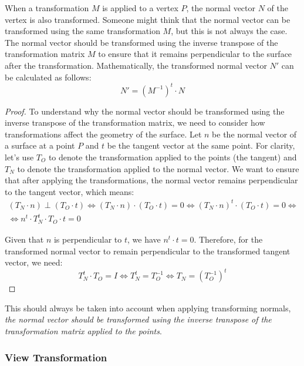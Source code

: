 When a transformation $M$ is applied to a vertex $P$, the normal vector $N$ of the vertex is also transformed. Someone might think that the normal vector can be transformed using the same transformation $M$, but this is not always the case. The normal vector should be transformed using the inverse transpose of the transformation matrix $M$ to ensure that it remains perpendicular to the surface after the transformation. Mathematically, the transformed normal vector $N'$ can be calculated as follows:
\begin{equation*}
    N' = (M^{-1})^t \cdot N
\end{equation*}
\begin{proof}
To understand why the normal vector should be transformed using the inverse transpose of the transformation matrix, we need to consider how transformations affect the geometry of the surface. Let $n$ be the normal vector of a surface at a point $P$ and $t$ be the tangent vector at the same point. For clarity, let's use $T_O$ to denote the transformation applied to the points (the tangent) and $T_N$ to denote the transformation applied to the normal vector. We want to ensure that after applying the transformations, the normal vector remains perpendicular to the tangent vector, which means:
\begin{multline*}
    (T_N \cdot n) \perp (T_O \cdot t)
    \iff (T_N \cdot n) \cdot (T_O \cdot t) = 0\iff (T_N \cdot n)^t \cdot (T_O \cdot t) = 0 \iff\\
    \iff n^t \cdot T_N^t \cdot T_O \cdot t = 0
\end{multline*}

Given that $n$ is perpendicular to $t$, we have $n^t \cdot t = 0$. Therefore, for the transformed normal vector to remain perpendicular to the transformed tangent vector, we need:
\begin{equation*}
    T_N^t \cdot T_O = I\iff T_N^t = T_O^{-1}\iff T_N = (T_O^{-1})^t
\end{equation*}
\end{proof}

This should always be taken into account when applying transforming normals, \emph{the normal vector should be transformed using the inverse transpose of the transformation matrix applied to the points}.

\subsubsection{View Transformation}


